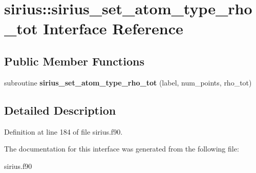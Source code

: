 \hypertarget{interfacesirius_1_1sirius__set__atom__type__rho__tot}{}\section{sirius\+:\+:sirius\+\_\+set\+\_\+atom\+\_\+type\+\_\+rho\+\_\+tot Interface Reference}
\label{interfacesirius_1_1sirius__set__atom__type__rho__tot}
\subsection*{Public Member Functions}
\begin{DoxyCompactItemize}
\item 
\hypertarget{interfacesirius_1_1sirius__set__atom__type__rho__tot_a057716e4b011c699aed65edcc02254ab}{}subroutine {\bfseries sirius\+\_\+set\+\_\+atom\+\_\+type\+\_\+rho\+\_\+tot} (label, num\+\_\+points, rho\+\_\+tot)\label{interfacesirius_1_1sirius__set__atom__type__rho__tot_a057716e4b011c699aed65edcc02254ab}

\end{DoxyCompactItemize}


\subsection{Detailed Description}


Definition at line 184 of file sirius.\+f90.



The documentation for this interface was generated from the following file\+:\begin{DoxyCompactItemize}
\item 
sirius.\+f90\end{DoxyCompactItemize}
